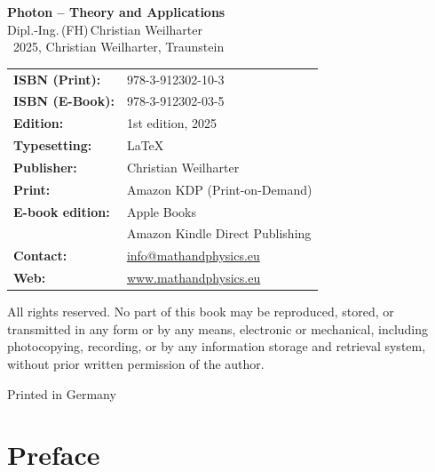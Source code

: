 \cleardoublepage
\thispagestyle{empty}
\begin{center}
	
	{\Large\textbf{Photon – Theory and Applications}}\\[1.2em]
	{\large Dipl.-Ing.\,(FH)\,Christian Weilharter}\\[1.2em]
	\textcopyright~2025, Christian Weilharter, Traunstein\\[2em]
\end{center}

\begin{flushleft}
	\begin{tabular}{@{}l l}
		\textbf{ISBN (Print):} & 978-3-912302-10-3\\[0.5em]
		\textbf{ISBN (E-Book):} & 978-3-912302-03-5 \\[0.5em]
		\textbf{Edition:} & 1st edition, 2025 \\[0.5em]
		\textbf{Typesetting:} & \LaTeX \\[0.5em]
		\textbf{Publisher:} & Christian Weilharter \\[0.5em]

		\textbf{Print:} & Amazon KDP (Print-on-Demand) \\[0.5em]
		\textbf{E-book edition:} & Apple Books \\[0.5em]
		& Amazon Kindle Direct Publishing \\[0.5em]
		\textbf{Contact:} & \href{mailto:info@mathandphysics.de}{info@mathandphysics.eu} \\[0.5em]
		\textbf{Web:} & \href{https://www.mathandphysics.de}{www.mathandphysics.eu} \\

	\end{tabular}
\end{flushleft}

\vspace{2em}
\noindent
All rights reserved. No part of this book may be reproduced, stored, or transmitted
in any form or by any means, electronic or mechanical, including photocopying,
recording, or by any information storage and retrieval system, without prior written
permission of the author.

\begin{center}\small Printed in Germany\end{center}

\cleardoublepage


\chapter*{Preface}



